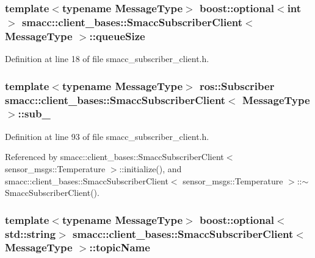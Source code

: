 \subsubsection[{\texorpdfstring{queue\+Size}{queueSize}}]{\setlength{\rightskip}{0pt plus 5cm}template$<$typename Message\+Type$>$ boost\+::optional$<$int$>$ {\bf smacc\+::client\+\_\+bases\+::\+Smacc\+Subscriber\+Client}$<$ Message\+Type $>$\+::queue\+Size}\hypertarget{classsmacc_1_1client__bases_1_1SmaccSubscriberClient_a67f03f081d83476cdb7fd631b6aba450}{}\label{classsmacc_1_1client__bases_1_1SmaccSubscriberClient_a67f03f081d83476cdb7fd631b6aba450}


Definition at line 18 of file smacc\+\_\+subscriber\+\_\+client.\+h.

\subsubsection[{\texorpdfstring{sub\+\_\+}{sub_}}]{\setlength{\rightskip}{0pt plus 5cm}template$<$typename Message\+Type$>$ ros\+::\+Subscriber {\bf smacc\+::client\+\_\+bases\+::\+Smacc\+Subscriber\+Client}$<$ Message\+Type $>$\+::sub\+\_\+\hspace{0.3cm}{\ttfamily [private]}}\hypertarget{classsmacc_1_1client__bases_1_1SmaccSubscriberClient_a0f69a1b0a284ae47f5d717c6ab95f089}{}\label{classsmacc_1_1client__bases_1_1SmaccSubscriberClient_a0f69a1b0a284ae47f5d717c6ab95f089}


Definition at line 93 of file smacc\+\_\+subscriber\+\_\+client.\+h.



Referenced by smacc\+::client\+\_\+bases\+::\+Smacc\+Subscriber\+Client$<$ sensor\+\_\+msgs\+::\+Temperature $>$\+::initialize(), and smacc\+::client\+\_\+bases\+::\+Smacc\+Subscriber\+Client$<$ sensor\+\_\+msgs\+::\+Temperature $>$\+::$\sim$\+Smacc\+Subscriber\+Client().

\subsubsection[{\texorpdfstring{topic\+Name}{topicName}}]{\setlength{\rightskip}{0pt plus 5cm}template$<$typename Message\+Type$>$ boost\+::optional$<$std\+::string$>$ {\bf smacc\+::client\+\_\+bases\+::\+Smacc\+Subscriber\+Client}$<$ Message\+Type $>$\+::topic\+Name}\hypertarget{classsmacc_1_1client__bases_1_1SmaccSubscriberClient_aeadf21a09412c6c9488e5acd50fb4f40}{}\label{classsmacc_1_1client__bases_1_1SmaccSubscriberClient_aeadf21a09412c6c9488e5acd50fb4f40}


